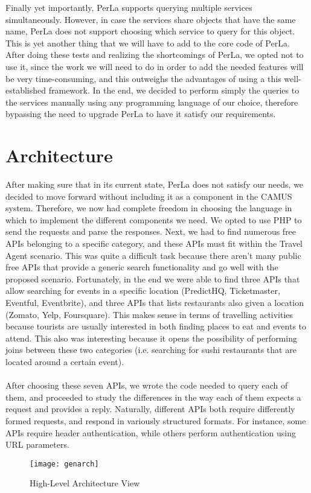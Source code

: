Finally yet importantly, PerLa supports querying multiple services simultaneously. However, in case the services share objects that have the same name, PerLa does not support choosing which service to query for this object. This is yet another thing that we will have to add to the core code of PerLa. After doing these tests and realizing the shortcomings of PerLa, we opted not to use it, since the work we will need to do in order to add the needed features will be very time-consuming, and this outweighs the advantages of using a this well-established framework. In the end, we decided to perform simply the queries to the services manually using any programming language of our choice, therefore bypassing the need to upgrade PerLa to have it satisfy our requirements.
\newpage
\section{Architecture}
\label{sec:architecture}
After making sure that in its current state, PerLa does not satisfy our needs, we decided to move forward without including it as a component in the CAMUS system. Therefore, we now had complete freedom in choosing the language in which to implement the different components we need. We opted to use PHP to send the requests and parse the responses. Next, we had to find numerous free APIs belonging to a specific category, and these APIs must fit within the Travel Agent scenario. This was quite a difficult task because there aren't many public free APIs that provide a generic search functionality and go well with the proposed scenario. Fortunately, in the end we were able to find three APIs that allow searching for events in a specific location (PredictHQ, Ticketmaster, Eventful, Eventbrite), and three APIs that lists restaurants also given a location (Zomato, Yelp, Foursquare). This makes sense in terms of travelling activities because tourists are usually interested in both finding places to eat and events to attend. This also was interesting because it opens the possibility of performing joins between these two categories (i.e. searching for sushi restaurants that are located around a certain event).\\\\
After choosing these seven APIs, we wrote the code needed to query each of them, and proceeded to study the differences in the way each of them expects a request and provides a reply. Naturally, different APIs both require differently formed requests, and respond in variously structured formats. For instance, some APIs require header authentication, while others perform authentication using URL parameters.
\newpage
\begin{figure}[h]
\centering
\texttt{[image: genarch]}
\caption{High-Level Architecture View}
\end{figure}
\newpage
